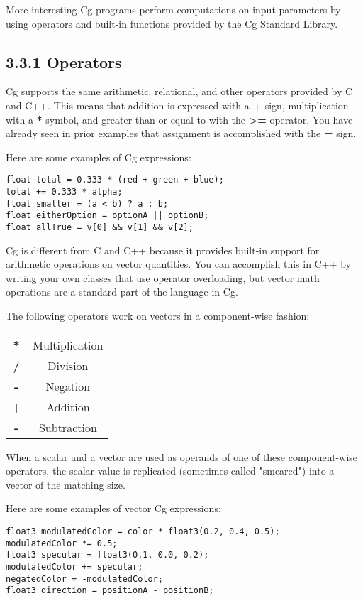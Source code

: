 \documentclass[../main.tex]{subfiles}
\begin{document}
More interesting Cg programs perform computations on input parameters by using operators and built-in functions provided by the Cg Standard Library.

\subsection{3.3.1 Operators}

Cg supports the same arithmetic, relational, and other operators provided by C and C++. This means that addition is expressed with a \textbf{+} sign, multiplication with a \textbf{*} symbol, and greater-than-or-equal-to with the \textbf{>=} operator. You have already seen in prior examples that assignment is accomplished with the \textbf{=} sign.

Here are some examples of Cg expressions:

\FloatBarrier
\begin{lstlisting}
float total = 0.333 * (red + green + blue);
total += 0.333 * alpha;
float smaller = (a < b) ? a : b;
float eitherOption = optionA || optionB;
float allTrue = v[0] && v[1] && v[2];
\end{lstlisting}
\FloatBarrier

Cg is different from C and C++ because it provides built-in support for arithmetic operations on vector quantities. You can accomplish this in C++ by writing your own classes that use operator overloading, but vector math operations are a standard part of the language in Cg.

The following operators work on vectors in a component-wise fashion:

\FloatBarrier
\begin{tabular}{ |c|c| } 
\textbf{*} & Multiplication \\
\textbf{/} & Division \\
\textbf{-} & Negation \\
\textbf{+} & Addition \\
\textbf{-} & Subtraction \\
\end{tabular}
\FloatBarrier

When a scalar and a vector are used as operands of one of these component-wise operators, the scalar value is replicated (sometimes called "smeared") into a vector of the matching size.

Here are some examples of vector Cg expressions:

\FloatBarrier
\begin{lstlisting}
float3 modulatedColor = color * float3(0.2, 0.4, 0.5);
modulatedColor *= 0.5;
float3 specular = float3(0.1, 0.0, 0.2);
modulatedColor += specular;
negatedColor = -modulatedColor;
float3 direction = positionA - positionB;
\end{lstlisting}
\FloatBarrier
\end{document}
